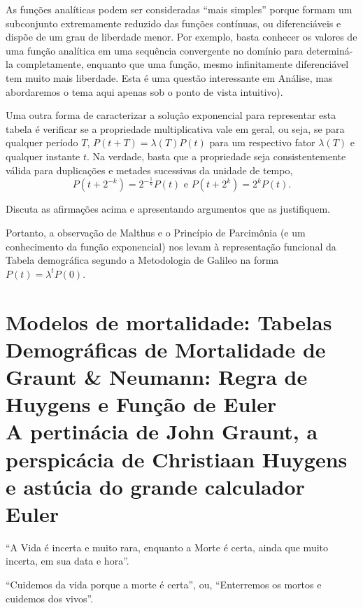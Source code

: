 \begin{remark}
    As funções analíticas podem ser consideradas ``mais simples'' porque formam um subconjunto extremamente reduzido das funções contínuas, ou diferenciáveis e dispõe de um grau de liberdade menor. Por exemplo, basta conhecer os valores de uma função analítica em uma sequência convergente no domínio para determiná-la completamente, enquanto que uma função, mesmo infinitamente diferenciável tem muito mais liberdade. Esta é uma questão interessante em Análise, mas abordaremos o tema aqui apenas sob o ponto de vista intuitivo).
\end{remark}

    Uma outra forma de caracterizar a solução exponencial para representar esta tabela é verificar se a propriedade multiplicativa vale em geral, ou seja, se para qualquer período \(T\), \(P(t+T) = \lambda(T) P(t)\) para um respectivo fator \(\lambda(T)\) e qualquer instante \(t\). Na verdade, basta que a propriedade seja consistentemente válida para duplicações e metades sucessivas da unidade de tempo,
    \[P\left(t+2^{-k}\right) = 2^{-\frac{1}{k}} P(t) \mbox{ e } P(t+2^{k}) = 2^{k} P(t).\]



\begin{exercise}
    Discuta as afirmações acima e apresentando argumentos que as justifiquem.
\end{exercise}

    Portanto, a observação de Malthus e o Princípio de Parcimônia (e um conhecimento da função exponencial) nos levam à representação funcional da Tabela demográfica segundo a Metodologia de Galileo na forma \(P(t) = \lambda^t P(0)\).

\section{Modelos de mortalidade: Tabelas Demográficas de Mortalidade de Graunt \& Neumann: Regra de Huygens e Função de Euler \\ A pertinácia de John Graunt, a perspicácia de Christiaan Huygens e astúcia do grande calculador Euler}


\begin{citacao}
``A Vida é incerta e muito rara, enquanto a Morte é certa, ainda que muito incerta, em sua data e hora''.


``Cuidemos da vida porque a morte é certa'', ou, ``Enterremos os mortos e cuidemos dos vivos''.

\end{citacao}

